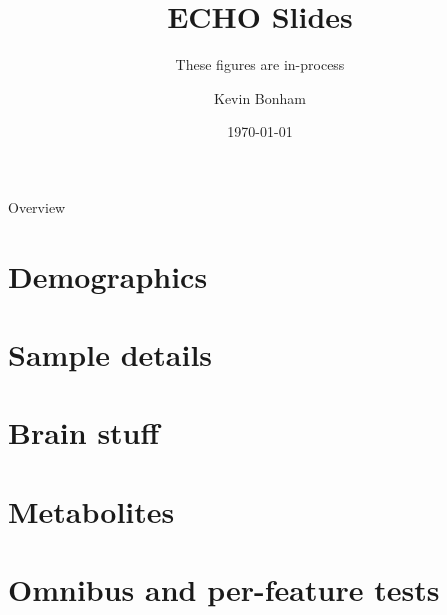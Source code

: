 \documentclass[aspectratio=169,xcolor=dvipsnames]{beamer}
\title[short title]{ECHO Slides} %
\subtitle{These figures are in-process}
\author[Bonham] {Kevin Bonham}
\institute[Wellesley College] %
{
    Department of Biological Sciences \\
    Wellesley College
}
\date{\today} %
\begin{document}
\begin{frame}
    \titlepage
\end{frame}

\begin{frame}{Overview}
    \tableofcontents
\end{frame}


\section{Demographics}



\section{Sample details}



\section{Brain stuff}



\section{Metabolites}



\section{Omnibus and per-feature tests}
\end{document}
